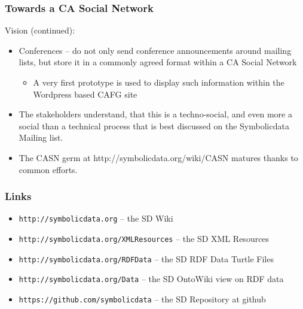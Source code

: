 \documentclass{beamer}
\begin{document}
\begin{frame}\frametitle{Towards a CA Social Network}
Vision (continued):
\begin{itemize}
\item Conferences -- do not only send conference announcements around mailing
  lists, but store it in a commonly agreed format within a CA Social Network
\begin{itemize}
\item A very first prototype is used to display such information within the
  Wordpress based CAFG site
\end{itemize}
\item The stakeholders understand, that this is a techno-social, and even more
  a social than a technical process that is best discussed on the Symbolicdata
  Mailing list.
\item The CASN germ at http://symbolicdata.org/wiki/CASN matures thanks to
  common efforts.
\end{itemize}
\end{frame}

\begin{frame}\frametitle{Links}\small
\begin{itemize}
\item \texttt{http://symbolicdata.org} -- the SD Wiki
\item \texttt{http://symbolicdata.org/XMLResources} -- the SD XML Resources
\item \texttt{http://symbolicdata.org/RDFData} -- the SD RDF Data Turtle Files
\item \texttt{http://symbolicdata.org/Data} -- the SD OntoWiki view on RDF
  data
\item \texttt{https://github.com/symbolicdata} -- the SD Repository at github
\end{itemize}
\end{frame}
\end{document}
